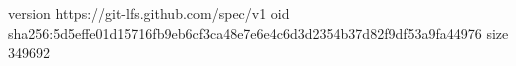 version https://git-lfs.github.com/spec/v1
oid sha256:5d5effe01d15716fb9eb6cf3ca48e7e6e4c6d3d2354b37d82f9df53a9fa44976
size 349692
